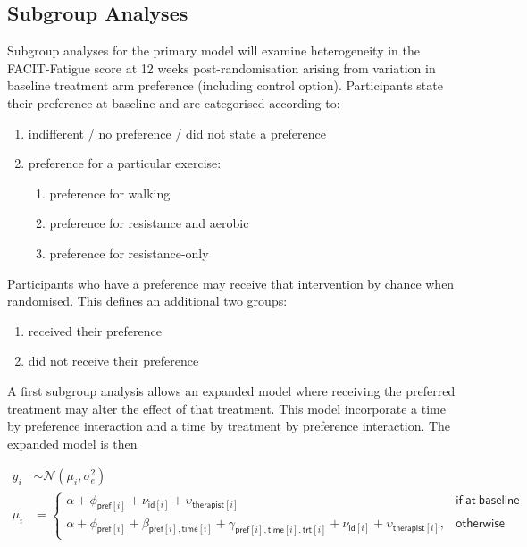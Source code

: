\documentclass[
]{article}
\begin{document}
\hypertarget{subgroup-analyses}{%
  \subsection{Subgroup Analyses}\label{subgroup-analyses}}

Subgroup analyses for the primary model will examine heterogeneity in the FACIT-Fatigue score at 12 weeks post-randomisation arising from variation in baseline treatment arm preference (including control option).
Participants state their preference at baseline and are categorised according to:

\begin{enumerate}
  \item indifferent / no preference / did not state a preference
  \item preference for a particular exercise:
        \begin{enumerate}
          \item preference for walking
          \item preference for resistance and aerobic
          \item preference for resistance-only
        \end{enumerate}
\end{enumerate}

Participants who have a preference may receive that intervention by chance when randomised.
This defines an additional two groups:
\begin{enumerate}
  \item received their preference
  \item did not receive their preference
\end{enumerate}

A first subgroup analysis allows an expanded model where receiving the preferred treatment may alter the effect of that treatment.
This model incorporate a time by preference interaction and a time by treatment by preference interaction.
The expanded model is then

\[
  \begin{aligned}
    y_{i} & \sim \mathcal{N}(\mu_{i}, \sigma_e^2) \\
    \mu_i & = \begin{cases}
      \alpha + \phi_{\mathsf{pref}[i]} + \nu_{\mathsf{id}[i]} + \upsilon_{\mathsf{therapist}[i]}                                                                                                             & \mathsf{if \ at \ baseline} \\
      \alpha + \phi_{\mathsf{pref}[i]} + \beta_{\mathsf{pref}[i], \mathsf{time}[i]} + \gamma_{\mathsf{pref}[i], \mathsf{time}[i],\mathsf{trt}[i]} + \nu_{\mathsf{id}[i]} + \upsilon_{\mathsf{therapist}[i]}, & \mathsf{otherwise}
    \end{cases}
  \end{aligned}
\]
\end{document}
